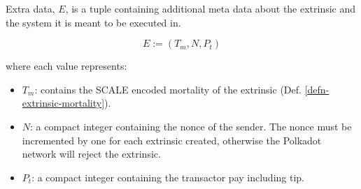 \begin{definition}
    \label{defn-extra-data}
    Extra data, $E$, is a tuple containing additional meta data about the
    extrinsic and the system it is meant to be executed in.

    \[
        E := (T_m, N, P_t)
    \]

    where each value represents:
    \begin{itemize}
        \item $T_m$: contains the SCALE encoded mortality of the extrinsic (Def.
        \ref{defn-extrinsic-mortality}).
        \item $N$: a compact integer containing the nonce of the sender. The
        nonce must be incremented by one for each extrinsic created, otherwise
        the Polkadot network will reject the extrinsic.
        \item $P_t$: a compact integer containing the transactor pay including tip.
    \end{itemize}

\end{definition}

